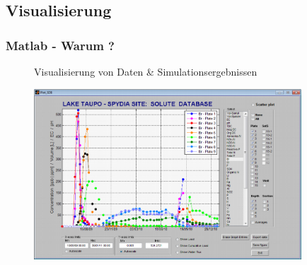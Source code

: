     \subsection{Visualisierung}
    \begin{frame}
      \frametitle{Matlab - Warum ?}
      \vspace{-0.8cm}
      \begin{figure}
        Visualisierung von Daten \& Simulationsergebnissen \par \vspace{0.4cm}
        \includegraphics[width=10.0cm]{visualisierung1.png}
      \end{figure}
    \end{frame}

